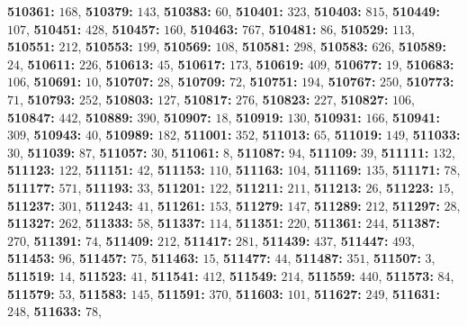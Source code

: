 \textsf{\bfseries 510361:} $168$, \textsf{\bfseries 510379:} $143$, \textsf{\bfseries 510383:} $60$, \textsf{\bfseries 510401:} $323$, \textsf{\bfseries 510403:} $815$, \textsf{\bfseries 510449:} $107$, \textsf{\bfseries 510451:} $428$, \textsf{\bfseries 510457:} $160$, \textsf{\bfseries 510463:} $767$, \textsf{\bfseries 510481:} $86$, \textsf{\bfseries 510529:} $113$, \textsf{\bfseries 510551:} $212$, \textsf{\bfseries 510553:} $199$, \textsf{\bfseries 510569:} $108$, \textsf{\bfseries 510581:} $298$, \textsf{\bfseries 510583:} $626$, \textsf{\bfseries 510589:} $24$, \textsf{\bfseries 510611:} $226$, \textsf{\bfseries 510613:} $45$, \textsf{\bfseries 510617:} $173$, \textsf{\bfseries 510619:} $409$, \textsf{\bfseries 510677:} $19$, \textsf{\bfseries 510683:} $106$, \textsf{\bfseries 510691:} $10$, \textsf{\bfseries 510707:} $28$, \textsf{\bfseries 510709:} $72$, \textsf{\bfseries 510751:} $194$, \textsf{\bfseries 510767:} $250$, \textsf{\bfseries 510773:} $71$, \textsf{\bfseries 510793:} $252$, \textsf{\bfseries 510803:} $127$, \textsf{\bfseries 510817:} $276$, \textsf{\bfseries 510823:} $227$, \textsf{\bfseries 510827:} $106$, \textsf{\bfseries 510847:} $442$, \textsf{\bfseries 510889:} $390$, \textsf{\bfseries 510907:} $18$, \textsf{\bfseries 510919:} $130$, \textsf{\bfseries 510931:} $166$, \textsf{\bfseries 510941:} $309$, \textsf{\bfseries 510943:} $40$, \textsf{\bfseries 510989:} $182$, \textsf{\bfseries 511001:} $352$, \textsf{\bfseries 511013:} $65$, \textsf{\bfseries 511019:} $149$, \textsf{\bfseries 511033:} $30$, \textsf{\bfseries 511039:} $87$, \textsf{\bfseries 511057:} $30$, \textsf{\bfseries 511061:} $8$, \textsf{\bfseries 511087:} $94$, \textsf{\bfseries 511109:} $39$, \textsf{\bfseries 511111:} $132$, \textsf{\bfseries 511123:} $122$, \textsf{\bfseries 511151:} $42$, \textsf{\bfseries 511153:} $110$, \textsf{\bfseries 511163:} $104$, \textsf{\bfseries 511169:} $135$, \textsf{\bfseries 511171:} $78$, \textsf{\bfseries 511177:} $571$, \textsf{\bfseries 511193:} $33$, \textsf{\bfseries 511201:} $122$, \textsf{\bfseries 511211:} $211$, \textsf{\bfseries 511213:} $26$, \textsf{\bfseries 511223:} $15$, \textsf{\bfseries 511237:} $301$, \textsf{\bfseries 511243:} $41$, \textsf{\bfseries 511261:} $153$, \textsf{\bfseries 511279:} $147$, \textsf{\bfseries 511289:} $212$, \textsf{\bfseries 511297:} $28$, \textsf{\bfseries 511327:} $262$, \textsf{\bfseries 511333:} $58$, \textsf{\bfseries 511337:} $114$, \textsf{\bfseries 511351:} $220$, \textsf{\bfseries 511361:} $244$, \textsf{\bfseries 511387:} $270$, \textsf{\bfseries 511391:} $74$, \textsf{\bfseries 511409:} $212$, \textsf{\bfseries 511417:} $281$, \textsf{\bfseries 511439:} $437$, \textsf{\bfseries 511447:} $493$, \textsf{\bfseries 511453:} $96$, \textsf{\bfseries 511457:} $75$, \textsf{\bfseries 511463:} $15$, \textsf{\bfseries 511477:} $44$, \textsf{\bfseries 511487:} $351$, \textsf{\bfseries 511507:} $3$, \textsf{\bfseries 511519:} $14$, \textsf{\bfseries 511523:} $41$, \textsf{\bfseries 511541:} $412$, \textsf{\bfseries 511549:} $214$, \textsf{\bfseries 511559:} $440$, \textsf{\bfseries 511573:} $84$, \textsf{\bfseries 511579:} $53$, \textsf{\bfseries 511583:} $145$, \textsf{\bfseries 511591:} $370$, \textsf{\bfseries 511603:} $101$, \textsf{\bfseries 511627:} $249$, \textsf{\bfseries 511631:} $248$, \textsf{\bfseries 511633:} $78$, 
